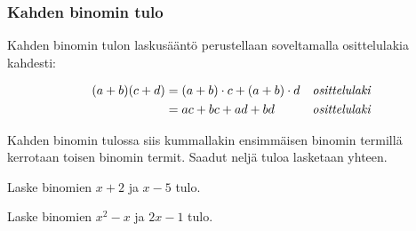 \subsubsection*{Kahden binomin tulo}

Kahden binomin tulon laskusääntö perustellaan soveltamalla osittelulakia kahdesti:

\begin{align*}
(a+b)(c+d) &= (a+b)\cdot c + (a+b)\cdot d &\emph{osittelulaki} \\
 &= ac+bc+ad+bd &\emph{osittelulaki} 
\end{align*}

Kahden binomin tulossa siis kummallakin ensimmäisen binomin termillä kerrotaan toisen binomin termit. Saadut neljä tuloa lasketaan yhteen. 

\newcommand{\pbezier}[4]{
	\pgfmathsetmacro{\PBxa}{#1}
	\pgfmathsetmacro{\PBxb}{#2}
	\pgfmathsetmacro{\PBya}{#3}
	\pgfmathsetmacro{\PByb}{#3+#4}
	\pgfmathsetmacro{\PBca}{0.8 * \PBxa + 0.2 * \PBxb}
	\pgfmathsetmacro{\PBcb}{0.2 * \PBxa + 0.8 * \PBxb}
	\draw[color=red] (\PBxa, \PBya) .. controls (\PBca, \PByb) and (\PBcb, \PByb) .. (\PBxb, \PBya);
}

\begin{esimerkki}
Laske binomien $x+2$ ja $x-5$ tulo. \\
\newline
\end{esimerkki}

\begin{esimerkki}
Laske binomien $x^2-x$ ja $2x-1$ tulo. \\
\newline
\end{esimerkki}




